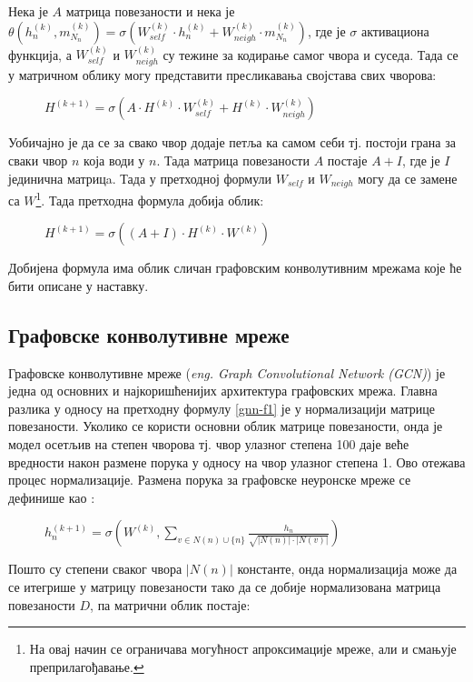 \documentclass[11pt,oneside]{memoir}
\begin{document}
Нека је $A$ матрица повезаности и нека је $\theta (h^{(k)}_n, m^{(k)}_{N_{n}}) = \sigma (W^{(k)}_{self}\cdot h^{(k)}_n + W^{(k)}_{neigh}\cdot m^{(k)}_{N_{n}})$,
где је $\sigma$ активациона функција, а $W^{(k)}_{self}$ и $W^{(k)}_{neigh}$ су тежине за кодирање самог чвора и суседа. Тада се у матричном облику
могу представити пресликавања својстава свих чворова:

\begin{figure}[H]
  \centering
  $H^{(k+1)} = \sigma (A\cdot H^{(k)}\cdot W^{(k)}_{self} + H^{(k)}\cdot W^{(k)}_{neigh})$
\end{figure}

Уобичајно је да се за свако чвор додаје петља ка самом себи тј. постоји грана за сваки чвор $n$ која води у $n$. Тада матрица повезаности $A$
постаје $A+I$, где је $I$ јединична матрицa. Тада у претходној формули $W_{self}$ и $W_{neigh}$ могу да се замене са $W$\footnote{На овај начин се 
ограничава могућност апроксимације мреже, али и смањује преприлагођавање.}. Тада претходна формула добија облик:

\begin{figure}[H]
  \centering
  $H^{(k+1)} = \sigma ((A+I)\cdot H^{(k)}\cdot W^{(k)})$
\end{figure}

Добијена формула има облик сличан графовским конволутивним мрежама које ће бити описане у наставку.

\subsection{Графовске конволутивне мреже}

Графовске конволутивне мреже (\textit{eng. Graph Convolutional Network (GCN)}) је једна од основних и најкоришћенијих архитектура графовских мрежа.
Главна разлика у односу на претходну формулу \ref{gnn-f1} је у нормализацији матрице повезаности. Уколико се користи основни облик матрице повезаности,
онда је модел осетљив на степен чворова тј. чвор улазног степена 100 даје веће вредности након размене порука у односу на чвор улазног степена 1.
Ово отежава процес нормализације. Размена порука за графовске неуронске мреже се дефинише као \cite{grl}:

\begin{figure}[H]
  \centering
  $h^{(k+1)}_n = \sigma (W^{(k)}, \sum_{v \in N(n) \cup \{n\}} \frac{h_n}{\sqrt{|N(n)|\cdot |N(v)|}})$
\end{figure}

Пошто су степени сваког чвора $|N(n)|$ константе, онда нормализација може да се итегрише у матрицу повезаности тако да се добије
нормализована матрица повезаности $D$, па матрични облик постаје:
\end{document}
